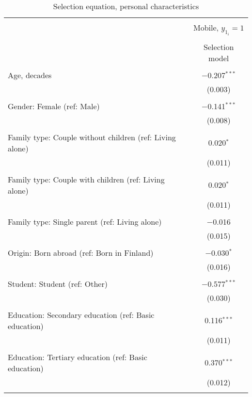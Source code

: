 
\begin{table}[!htbp] \centering 
  \caption{Selection equation, personal characteristics} 
  \label{} 
\begin{tabular}{@{\extracolsep{5pt}}lc} 
\\[-1.8ex]\hline 
\hline \\[-1.8ex] 
 & \multicolumn{1}{c}{Mobile, $y_{1_i} = 1$} \\ 
\cline{2-2} 
\\[-1.8ex] & Selection model \\ 
\hline \\[-1.8ex] 
 Age, decades & $-$0.207$^{***}$ \\ 
  & (0.003) \\ 
  & \\ 
 Gender: Female (ref: Male) & $-$0.141$^{***}$ \\ 
  & (0.008) \\ 
  & \\ 
 Family type: Couple without children (ref: Living alone) & 0.020$^{*}$ \\ 
  & (0.011) \\ 
  & \\ 
 Family type: Couple with children (ref: Living alone) & 0.020$^{*}$ \\ 
  & (0.011) \\ 
  & \\ 
 Family type: Single parent (ref: Living alone) & $-$0.016 \\ 
  & (0.015) \\ 
  & \\ 
 Origin: Born abroad (ref: Born in Finland) & $-$0.030$^{*}$ \\ 
  & (0.016) \\ 
  & \\ 
 Student: Student (ref: Other) & $-$0.577$^{***}$ \\ 
  & (0.030) \\ 
  & \\ 
 Education: Secondary education (ref: Basic education) & 0.116$^{***}$ \\ 
  & (0.011) \\ 
  & \\ 
 Education: Tertiary education (ref: Basic education) & 0.370$^{***}$ \\ 
  & (0.012) \\ 
  & \\ 

\end{tabular}
\end{table}
